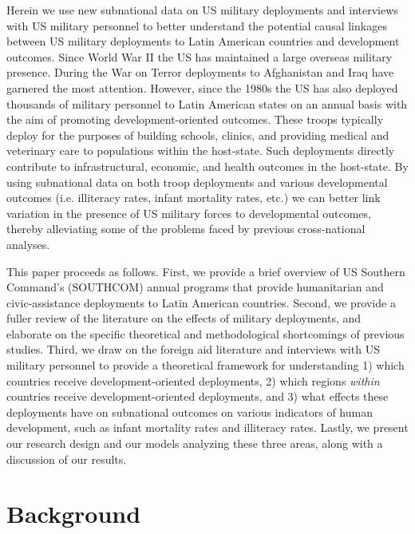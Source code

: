 \documentclass[12pt]{article}
\begin{document}
\begin{doublespace}
Herein we use new subnational data on US military deployments and interviews with US military personnel to better understand the potential causal linkages between US military deployments to Latin American countries and development outcomes. Since World War II the US has maintained a large overseas military presence. During the War on Terror deployments to Afghanistan and Iraq have garnered the most attention. However, since the 1980s the US has also deployed thousands of military personnel to Latin American states on an annual basis with the aim of promoting development-oriented outcomes. These troops typically deploy for the purposes of building schools, clinics, and providing medical and veterinary care to populations within the host-state. Such deployments directly contribute to infrastructural, economic, and health outcomes in the host-state. By using subnational data on both troop deployments and various developmental outcomes (i.e. illiteracy rates, infant mortality rates, etc.) we can better link variation in the presence of US military forces to developmental outcomes, thereby alleviating some of the problems faced by previous cross-national analyses. 

This paper proceeds as follows. First, we provide a brief overview of US Southern Command's (SOUTHCOM) annual programs that provide humanitarian and civic-assistance deployments to Latin American countries. Second, we provide a fuller review of the literature on the effects of military deployments, and elaborate on the specific theoretical and methodological shortcomings of previous studies. Third, we draw on the foreign aid literature and interviews with US military personnel to provide a theoretical framework for understanding 1) which countries receive development-oriented deployments, 2) which regions \textit{within} countries receive development-oriented deployments, and 3) what effects these deployments have on subnational outcomes on various indicators of human development, such as infant mortality rates and illiteracy rates. Lastly, we present our research design and our models analyzing these three areas, along with a discussion of our results.

\section{Background}


\end{doublespace}
\end{document}
